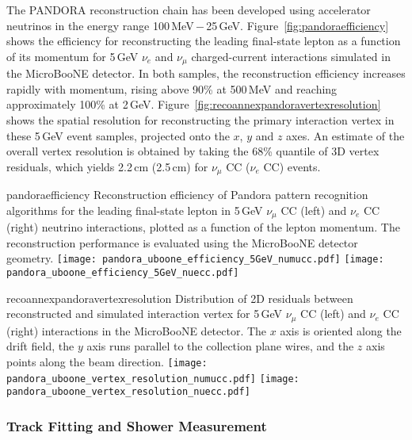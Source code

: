 The PANDORA reconstruction chain has been developed using accelerator neutrinos 
in the energy range 100\,MeV\,$-$\,25\,GeV.
Figure~\ref{fig:pandoraefficiency} shows the efficiency for reconstructing
the leading final-state lepton as a function of its momentum
for 5\,GeV $\nu_{e}$ and $\nu_{\mu}$ charged-current interactions
simulated in the MicroBooNE detector.
In both samples, the reconstruction efficiency increases rapidly with momentum,
rising above 90\% at 500\,MeV and reaching approximately 100\% at 2\,GeV.
Figure~\ref{fig:recoannexpandoravertexresolution} shows the spatial resolution for
reconstructing the primary interaction vertex in these 5\,GeV event samples,
projected onto the $x$, $y$ and $z$ axes. An estimate of the overall vertex 
resolution is obtained by taking the 68\% quantile of 3D vertex residuals, 
which yields 2.2\,cm (2.5\,cm) for $\nu_{\mu}$ CC ($\nu_{e}$ CC) events.

\begin{cdrfigure}{pandoraefficiency}
{Reconstruction efficiency of Pandora pattern recognition algorithms
 for the leading final-state lepton in 5\,GeV $\nu_{\mu}$ CC (left) and
 $\nu_{e}$ CC (right) neutrino interactions, plotted as a function of
 the lepton momentum. The reconstruction performance is evaluated
 using the MicroBooNE detector geometry. }
\texttt{[image: pandora\_uboone\_efficiency\_5GeV\_numucc.pdf]}
\texttt{[image: pandora\_uboone\_efficiency\_5GeV\_nuecc.pdf]}
\end{cdrfigure}

\begin{cdrfigure}{recoannexpandoravertexresolution}
{Distribution of 2D residuals between reconstructed and simulated interaction
 vertex for 5\,GeV $\nu_{\mu}$ CC (left) and $\nu_{e}$ CC (right) interactions in the MicroBooNE detector.
 The $x$ axis is oriented along the drift field, the $y$ axis runs parallel 
 to the collection plane wires, and the $z$ axis points along the beam direction.}
\texttt{[image: pandora\_uboone\_vertex\_resolution\_numucc.pdf]}
\texttt{[image: pandora\_uboone\_vertex\_resolution\_nuecc.pdf]}
\end{cdrfigure}


\subsubsection{Track Fitting and Shower Measurement}

